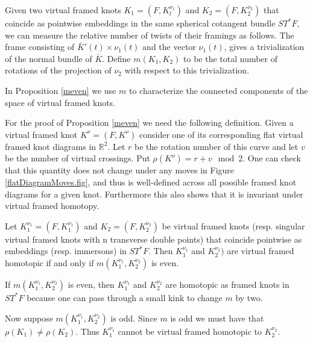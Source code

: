Given two virtual framed knots $K_1=(F,K_l^{\nu_1})$ and $K_2=(F,K_2^{\nu_2})$ that coincide as pointwise embeddings in the same spherical cotangent bundle $ST^*F$, we can measure the relative number of twists of their framings as follows.  The frame consisting of $\bar{K}'(t) \times \nu_1(t)$ and the vector ${\nu_1}(t)$, gives a trivialization of the normal bundle of $\bar{K}$.  Define $m(K_1,K_2)$ to be the total number of rotations of the projection of $\nu_2$ with respect to this trivialization.


In Proposition \ref{meven} we use $m$ to characterize the connected components of the space of virtual framed knots.

For the proof of Proposition \ref{meven} we need the following definition.  Given a virtual framed knot $K^\nu = (F, K^\nu)$ consider one of its corresponding flat virtual framed knot diagrams in $\mathbb{R}^2$.  Let $r$ be the rotation number of this curve and let $v$ be the number of virtual crossings.  Put $\rho(K^\nu) = r + v \mod{2}$.  One can check that this quantity does not change under any moves in Figure \ref{flatDiagramMoves.fig}, and thus is well-defined across all possible framed knot diagrams for a given knot. Furthermore this also shows that it is invariant under virtual framed homotopy. 

\begin{prop} \label{meven}
Let $K_1^{\nu_1} = (F, K_1^{\nu_1})$ and $K_2 = (F, K_2^{\nu_2})$ be virtual framed knots (resp. singular virtual framed knots with n transverse double points) that coincide pointwise as embeddings (resp. immersons) in $ST^*F$.  Then $K_1^{\nu_1}$ and $K_2^{\nu_2})$ are virtual framed homotopic if and only if $m( K_1^{\nu_1}, K_2^{\nu_2})$ is even.
\end{prop}
\pp If $m( K_1^{\nu_1}, K_2^{\nu_2})$ is even, then $K_1^{\nu_1}$ and $K_2^{\nu_2}$ are homotopic as framed knots in $ST^*F$ because one can pass through a small kink to change $m$ by two.

Now suppose $m( K_1^{\nu_1}, K_2^{\nu_2})$ is odd.  Since $m$ is odd we must have that $\rho(K_1) \neq \rho(K_2)$.  Thus $K_1^{\nu_1}$ cannot be virtual framed homotopic to $K_2^{\nu_2}$.

